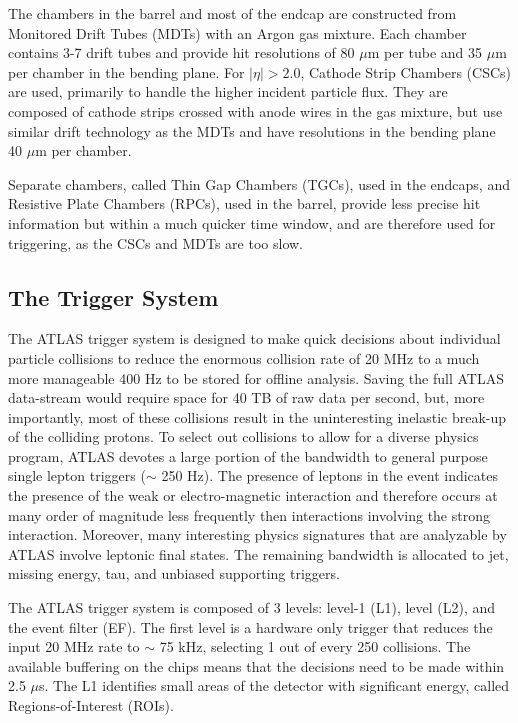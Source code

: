 The chambers in the barrel and most of the endcap are constructed from Monitored Drift Tubes (MDTs) with an Argon gas mixture. Each chamber contains 3-7 drift tubes and provide hit resolutions of 80 $\mu$m per tube and 35 $\mu$m per chamber in the bending plane. For $|\eta| > 2.0$, Cathode Strip Chambers (CSCs) are used, primarily to handle the higher incident particle flux. They are composed of cathode strips crossed with anode wires in the gas mixture, but use similar drift technology as the MDTs and have resolutions in the bending plane 40 $\mu$m per chamber. 

Separate chambers, called Thin Gap Chambers (TGCs), used in the endcaps, and Resistive Plate Chambers (RPCs), used in the barrel, provide less precise hit information but within a much quicker time window, and are therefore used for triggering, as the CSCs and MDTs are too slow.


\subsection{The Trigger System} 


The ATLAS trigger system is designed to make quick decisions about individual particle collisions to reduce the enormous collision rate of 20 MHz to a much more manageable 400 Hz to be stored for offline analysis. Saving the full ATLAS data-stream would require space for 40 TB of raw data per second, but, more importantly, most of these collisions result in the uninteresting inelastic break-up of the colliding protons. To select out collisions to allow for a diverse physics program, ATLAS devotes a large portion of the bandwidth to general purpose single lepton triggers ($\sim$ 250 Hz). The presence of leptons in the event indicates the presence of the weak or electro-magnetic interaction and therefore occurs at many order of magnitude less frequently then interactions involving the strong interaction. Moreover, many interesting physics signatures that are analyzable by ATLAS involve leptonic final states. The remaining bandwidth is allocated to jet, missing energy, tau, and unbiased supporting triggers.

The ATLAS trigger system is composed of 3 levels: level-1 (L1), level (L2), and the event filter (EF). The first level is a hardware only trigger that reduces the input 20 MHz rate to $\sim$ 75 kHz, selecting 1 out of every 250 collisions. The available buffering on the chips means that the decisions need to be made within 2.5 $\mu$s. The L1 identifies small areas of the detector with significant energy, called Regions-of-Interest (ROIs).


